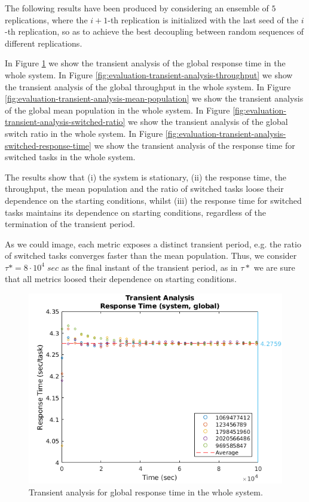 The following results have been produced by considering an ensemble of $5$ replications, where the $i+1$-th replication is initialized with the last seed of the $i$-th replication, so as to achieve the best decoupling between random sequences of different replications.

In Figure \ref{fig:evaluation-transient-analysis-response-time} we show the transient analysis of the global response time in the whole system.
%
In Figure \ref{fig:evaluation-transient-analysis-throughput} we show the transient analysis of the global throughput in the whole system.
%
In Figure \ref{fig:evaluation-transient-analysis-mean-population} we show the transient analysis of the global mean population in the whole system.
%
In Figure \ref{fig:evaluation-transient-analysis-switched-ratio} we show the transient analysis of the global switch ratio in the whole system.
%
In Figure \ref{fig:evaluation-transient-analysis-switched-response-time} we show the transient analysis of the response time for switched tasks in the whole system.

The results show that 
(i) the system is stationary,
(ii) the response time, the throughput, the mean population and the ratio of switched tasks loose their dependence on the starting conditions, whilst 
(iii) the response time for switched tasks maintains its dependence on starting conditions, regardless of the termination of the transient period.

As we could image, each metric exposes a distinct transient period, e.g. the ratio of switched tasks converges faster than the mean population. Thus, we consider $\tau*=8\cdot 10^{4}\;sec$ as the final instant of the transient period, as in $\tau*$ we are sure that all metrics loosed their dependence on starting conditions.

\begin{figure}
	\includegraphics[width=\columnwidth]{fig/evaluation-transient-analysis-response-time}
	\caption{Transient analysis for global response time in the whole system.}
	\label{fig:evaluation-transient-analysis-response-time}
\end{figure}

